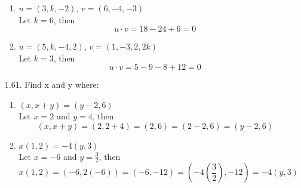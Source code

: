 \documentclass[12pt]{article}
\begin{document}
\begin{enumerate}
\begin{enumerate}
	\item $u=(3,k,-2)$, $v=(6,-4,-3)$\\
		Let $k=6$, then
		\[ u \cdot v = 18 - 24 + 6 = 0 \]
	\item $u=(5,k,-4,2)$, $v=(1,-3,2,2k)$\\
		Let $k=3$, then
		\[ u \cdot v = 5 - 9 - 8 + 12 =  0 \]
	\end{enumerate}
\item[1.61.] Find x and y where:
	\begin{enumerate}
	\item $(x,x+y)=(y-2,6)$\\
		Let $x=2$ and $y=4$, then
		\[ (x,x+y) = (2, 2+4) = (2,6) = (2-2,6) = (y-2,6) \]
	\item $x(1,2)=-4(y,3)$\\
		Let $x=-6$ and $y=\frac{3}{2}$, then
		\[ x(1,2) = (-6,2(-6)) = (-6,-12) = (-4(\frac{3}{2}),-12) = -4(y,3) \]
	\end{enumerate}
	

\end{enumerate}
\end{document}
